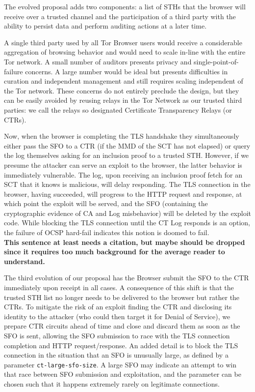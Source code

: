 The evolved proposal adds two components: a list of STHs that the browser will receive over a trusted channel and the participation of a third party with the ability to persist data and perform auditing actions at a later time.

A single third party used by all Tor Browser users would receive a considerable aggregation of browsing behavior and would need to scale in-line with the entire Tor network. A small number of auditors presents privacy and single-point-of-failure concerns. A large number would be ideal but presents difficulties in curation and independent management and still requires scaling independent of the Tor network. These concerns do not entirely preclude the design, but they can be easily avoided by reusing relays in the Tor Network as our trusted third parties: we call the relays so designated Certificate Transparency Relays (or CTRs).

Now, when the browser is completing the TLS handshake they simultaneously either pass the SFO to a CTR (if the MMD of the SCT has not elapsed) or query the log themselves asking for an inclusion proof to a trusted STH\@.  However, if we presume the attacker can serve an exploit to the browser, the latter behavior is immediately vulnerable. The log, upon receiving an inclusion proof fetch for an SCT that it knows is malicious, will delay responding. The TLS connection in the browser, having succeeded, will progress to the HTTP request and response, at which point the exploit will be served, and the SFO (containing the cryptographic evidence of CA and Log misbehavior) will be deleted by the exploit code. While blocking the TLS connection until the CT Log responds is an option, the failure of OCSP hard-fail indicates this notion is doomed to fail.\\ %
{\bf \color{red}This sentence at least needs a citation, but maybe should be dropped since it requires too much background for the average reader to understand.}

The third evolution of our proposal has the Browser submit the SFO to the CTR immediately upon receipt in all cases. A consequence of this shift is that the trusted STH list no longer needs to be delivered to the browser but rather the CTRs. To mitigate the risk of an exploit finding the CTR and disclosing its identity to the attacker (who could then target it for Denial of Service), we prepare CTR circuits ahead of time and close and discard them as soon as the SFO is sent, allowing the SFO submission to race with the TLS connection completion and HTTP request/response.  An added detail is to block the TLS connection in the situation that an SFO is unusually large, as defined by a parameter \texttt{ct-large-sfo-size}. A large SFO may indicate an attempt to win that race between SFO submission and exploitation, and the parameter can be chosen such that it happens extremely rarely on legitimate connections.

